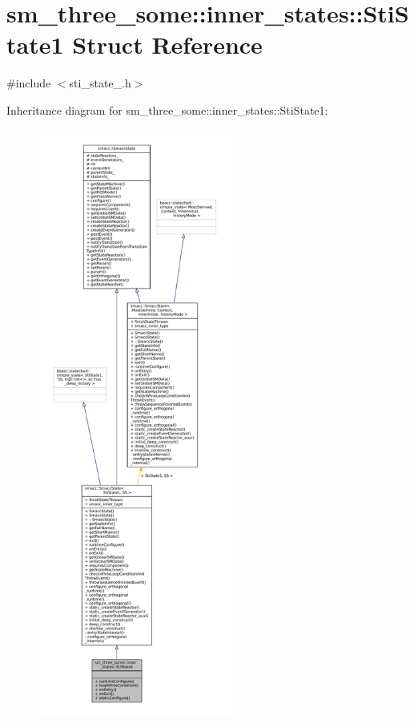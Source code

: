 \hypertarget{structsm__three__some_1_1inner__states_1_1StiState1}{}\section{sm\+\_\+three\+\_\+some\+:\+:inner\+\_\+states\+:\+:Sti\+State1 Struct Reference}
\label{structsm__three__some_1_1inner__states_1_1StiState1}


{\ttfamily \#include $<$sti\+\_\+state\+\_.\+h$>$}



Inheritance diagram for sm\+\_\+three\+\_\+some\+:\+:inner\+\_\+states\+:\+:Sti\+State1\+:
\nopagebreak
\begin{figure}[H]
\begin{center}
\leavevmode
\includegraphics[height=550pt]{structsm__three__some_1_1inner__states_1_1StiState1__inherit__graph}
\end{center}
\end{figure}


